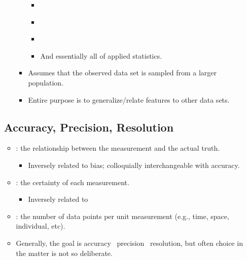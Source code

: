 \begin{itemize}
\begin{itemize}
\begin{itemize}
\begin{itemize}
            \item \hyperref[Chapter: Probability Theory]{}
            \item \hyperref[Chapter: Hypothesis Testing]{}
            \item \hyperref[Section: Confidence Intervals]{}
            \item And essentially all of applied statistics.
          \end{itemize}
        \item Assumes that the observed data set is sampled from a larger population. 
        \item Entire purpose is to generalize/relate features to other data sets.
      \end{itemize}
  \end{itemize}

  \subsection{Accuracy, Precision, Resolution}
  \begin{itemize}
    \item {}: the relationship between the measurement and the actual truth.
      \begin{itemize}
        \item Inversely related to bias; colloquially interchangeable with accuracy. 
      \end{itemize}
    \item {}: the certainty of each measurement.
      \begin{itemize}
        \item Inversely related to \hyperref[Subsection: Measures of Dispersion]{}
      \end{itemize}
    \item {}: the number of data points per unit measurement (e.g., time, space, individual, etc).
    \item Generally, the goal is accuracy \to~precision \to~resolution, but often choice in the matter is not so deliberate.
  \end{itemize}
  

\end{itemize}
